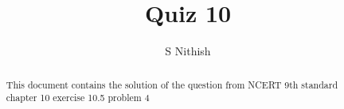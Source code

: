 \documentclass[journal,12pt,twocolumn]{IEEEtran}
\begin{document}
\let\StandardTheFigure\thefigure
\let\vec\mathbf
\renewcommand{\thefigure}{\theproblem}



\def\putbox#1#2#3{\makebox[0in][l]{\makebox[#1][l]{}\raisebox{\baselineskip}[0in][0in]{\raisebox{#2}[0in][0in]{#3}}}}
     \def\rightbox#1{\makebox[0in][r]{#1}}
     \def\centbox#1{\makebox[0in]{#1}}
     \def\topbox#1{\raisebox{-\baselineskip}[0in][0in]{#1}}
     \def\midbox#1{\raisebox{-0.5\baselineskip}[0in][0in]{#1}}

\vspace{3cm}


\title{Quiz 10}
\author{S Nithish}
\maketitle

\newpage


\bigskip

\renewcommand{\thefigure}{\theenumi}
\renewcommand{\thetable}{\theenumi}


\begin{abstract}
This document contains the solution of the question from NCERT 9th standard chapter 10 exercise 10.5 problem 4
\end{abstract}

%

%
%
\end{document}
